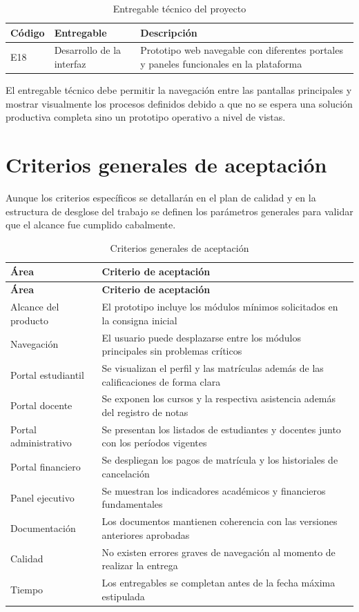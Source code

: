 \documentclass[11pt,spanish]{article}
\begin{document}
\begin{table}[H]
\centering
\caption{Entregable técnico del proyecto}
\label{tab:entregable-tecnico}
{\small
\begin{tabularx}{\textwidth}{L{1.5cm} L{4.8cm} Y}
\toprule
\textbf{Código} & \textbf{Entregable} & \textbf{Descripción} \\
\midrule
E18 & Desarrollo de la interfaz & Prototipo web navegable con diferentes portales y paneles funcionales en la plataforma \\
\bottomrule
\end{tabularx}
}
\end{table}

El entregable técnico debe permitir la navegación entre las pantallas principales y mostrar visualmente los procesos definidos debido a que no se espera una solución productiva completa sino un prototipo operativo a nivel de vistas.

\section{Criterios generales de aceptación}

Aunque los criterios específicos se detallarán en el plan de calidad y en la estructura de desglose del trabajo se definen los parámetros generales para validar que el alcance fue cumplido cabalmente.

\begin{longtable}{L{4.6cm} L{9.8cm}}
\caption{Criterios generales de aceptación}\label{tab:criterios-aceptacion}\\[-0.5em]
\toprule
\textbf{Área} & \textbf{Criterio de aceptación} \\
\midrule
\endfirsthead
\toprule
\textbf{Área} & \textbf{Criterio de aceptación} \\
\midrule
\endhead
Alcance del producto & El prototipo incluye los módulos mínimos solicitados en la consigna inicial \\
Navegación & El usuario puede desplazarse entre los módulos principales sin problemas críticos \\
Portal estudiantil & Se visualizan el perfil y las matrículas además de las calificaciones de forma clara \\
Portal docente & Se exponen los cursos y la respectiva asistencia además del registro de notas \\
Portal administrativo & Se presentan los listados de estudiantes y docentes junto con los períodos vigentes \\
Portal financiero & Se despliegan los pagos de matrícula y los historiales de cancelación \\
Panel ejecutivo & Se muestran los indicadores académicos y financieros fundamentales \\
Documentación & Los documentos mantienen coherencia con las versiones anteriores aprobadas \\
Calidad & No existen errores graves de navegación al momento de realizar la entrega \\
Tiempo & Los entregables se completan antes de la fecha máxima estipulada \\
\bottomrule
\end{longtable}
\end{document}
